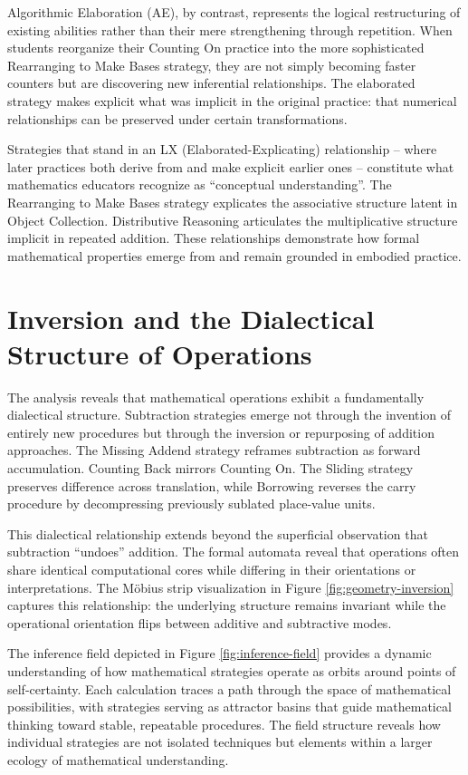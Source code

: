 \documentclass[12pt]{book}
\begin{document}
Algorithmic Elaboration (AE), by contrast, represents the logical restructuring of existing abilities rather than their mere strengthening through repetition. When students reorganize their Counting On practice into the more sophisticated Rearranging to Make Bases strategy, they are not simply becoming faster counters but are discovering new inferential relationships. The elaborated strategy makes explicit what was implicit in the original practice: that numerical relationships can be preserved under certain transformations.

Strategies that stand in an LX (Elaborated-Explicating) relationship -- where later practices both derive from and make explicit earlier ones -- constitute what mathematics educators recognize as \enquote{conceptual understanding}. The Rearranging to Make Bases strategy explicates the associative structure latent in Object Collection. Distributive Reasoning articulates the multiplicative structure implicit in repeated addition. These relationships demonstrate how formal mathematical properties emerge from and remain grounded in embodied practice.

\section{Inversion and the Dialectical Structure of Operations}

The analysis reveals that mathematical operations exhibit a fundamentally dialectical structure. Subtraction strategies emerge not through the invention of entirely new procedures but through the inversion or repurposing of addition approaches. The Missing Addend strategy reframes subtraction as forward accumulation. Counting Back mirrors Counting On. The Sliding strategy preserves difference across translation, while Borrowing reverses the carry procedure by decompressing previously sublated place-value units.

This dialectical relationship extends beyond the superficial observation that subtraction ``undoes'' addition. The formal automata reveal that operations often share identical computational cores while differing in their orientations or interpretations. The Möbius strip visualization in Figure \ref{fig:geometry-inversion} captures this relationship: the underlying structure remains invariant while the operational orientation flips between additive and subtractive modes.

The inference field depicted in Figure \ref{fig:inference-field} provides a dynamic understanding of how mathematical strategies operate as orbits around points of self-certainty. Each calculation traces a path through the space of mathematical possibilities, with strategies serving as attractor basins that guide mathematical thinking toward stable, repeatable procedures. The field structure reveals how individual strategies are not isolated techniques but elements within a larger ecology of mathematical understanding.
\end{document}

